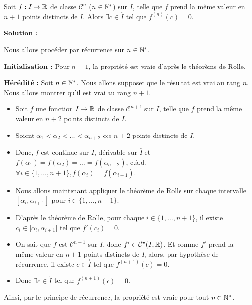 \documentclass[12pt, a4paper]{report}
\begin{document}
\begin{exercise}
  Soit $f:I\to\mathbb{R}$ de classe $\mathcal{C}^n$ ($n\in\mathbb{N}^*$) sur $I$, telle que $f$ prend la même valeur en $n+1$ points distincts de $I$. Alors $\exists c\in \overset{\circ}{I}$ tel que $f^{(n)}(c) = 0$.

  \textbf{Solution :}

  Nous allons procéder par récurrence sur $n\in\mathbb{N}^*$.

  \textbf{Initialisation :} Pour $n=1$, la propriété est vraie d'après le théorème de Rolle.

  \textbf{Hérédité :} Soit $n\in\mathbb{N}^*$. Nous allons supposer que le résultat est vrai au rang $n$. Nous allons montrer qu'il est vrai au rang $n+1$.
  \begin{itemize}
  \item Soit $f$ une fonction $I\to\mathbb{R}$ de classe $\mathcal{C}^{n+1}$ sur $I$, telle que $f$ prend la même valeur en $n+2$ points distincts de $I$.
  
  \item Soient $\alpha_1<\alpha_2<\dots<\alpha_{n+2}$ ces $n+2$ points distincts de $I$.
  
  \item Donc, $f$ est continue sur $I$, dérivable sur $\overset{\circ}{I}$ et $f(\alpha_1) = f(\alpha_2) = \dots = f(\alpha_{n+2})$, c.à.d. $\forall i \in \{1,\dots,n+1\}, f(\alpha_i) = f(\alpha_{i+1})$.

  \item Nous allons maintenant appliquer le théorème de Rolle sur chaque intervalle $[\alpha_i, \alpha_{i+1}]$ pour $i \in \{1,\dots,n+1\}$.

  \item D'après le théorème de Rolle, pour chaque $i \in \{1,\dots,n+1\}$, il existe $c_i \in ]\alpha_i, \alpha_{i+1}[$ tel que $f'(c_i) = 0$.

  \item On sait que $f$ est $\mathcal{C}^{n+1}$ sur $I$, donc $f' \in \mathcal{C}^n(I,\mathbb{R})$. Et comme $f'$ prend la même valeur en $n+1$ points distincts de $I$, alors, par hypothèse de récurrence, il existe $c \in \overset{\circ}{I}$ tel que $f^{(n+1)}(c) = 0$.

  \item Donc $\exists c \in \overset{\circ}{I}$ tel que $f^{(n+1)}(c) = 0$.
  \end{itemize}

  Ainsi, par le principe de récurrence, la propriété est vraie pour tout $n \in \mathbb{N}^*$.
\end{exercise}
\end{document}
